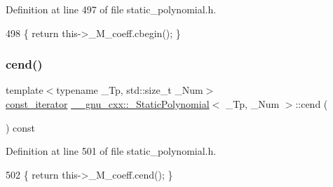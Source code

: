 Definition at line 497 of file static\+\_\+polynomial.\+h.


\begin{DoxyCode}
498       \{ \textcolor{keywordflow}{return} this->\_M\_coeff.cbegin(); \}
\end{DoxyCode}
\mbox{\label{class____gnu__cxx_1_1__StaticPolynomial_a512bb54065e7f5fbfd13776681f4055a}} 
\subsubsection{\texorpdfstring{cend()}{cend()}}
{\footnotesize\ttfamily template$<$typename \+\_\+\+Tp, std\+::size\+\_\+t \+\_\+\+Num$>$ \\
\hyperlink{class____gnu__cxx_1_1__StaticPolynomial_a6fac29559236e7576f7e35b03d35ee08}{const\+\_\+iterator} \hyperlink{class____gnu__cxx_1_1__StaticPolynomial}{\+\_\+\+\_\+gnu\+\_\+cxx\+::\+\_\+\+Static\+Polynomial}$<$ \+\_\+\+Tp, \+\_\+\+Num $>$\+::cend (\begin{DoxyParamCaption}{ }\end{DoxyParamCaption}) const\hspace{0.3cm}{\ttfamily [inline]}}



Definition at line 501 of file static\+\_\+polynomial.\+h.


\begin{DoxyCode}
502       \{ \textcolor{keywordflow}{return} this->\_M\_coeff.cend(); \}
\end{DoxyCode}
\mbox{\label{class____gnu__cxx_1_1__StaticPolynomial_ac47c4358991607e52e8cddceaa8986d4}} 
